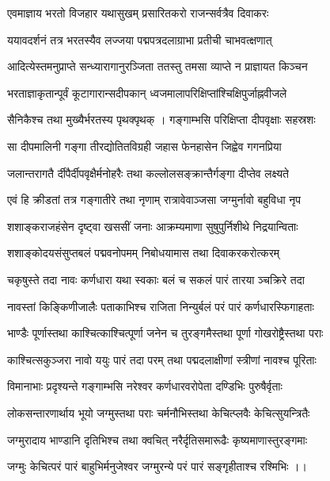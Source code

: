 \twolineshloka
{एवमाज्ञाय भरतो विजहार यथासुखम्}
{प्रसारितकरो राजन्सर्वत्रैव दिवाकरः}%

\twolineshloka
{ययावदर्शनं तत्र भरतस्यैव लज्जया}
{पद्मपत्रदलाग्राभा प्रतीची चाभवत्क्षणात्}%

\twolineshloka
{आदित्येस्तमनुप्राप्ते सन्ध्यारागानुरञ्जिता}
{ततस्तु तमसा व्याप्ते न प्राज्ञायत किञ्चन}%

\twolineshloka
{भरताज्ञाकृतान्पूर्वं कूटागारान्सदीपकान्}
{ध्वजमालापरिक्षिप्तांश्चिक्षिपुर्जाह्नवीजले}%

\twolineshloka
{सैनिकैश्च तथा मुख्यैर्भरतस्य पृथक्पृथक् ।}
{गङ्गाम्भसि परिक्षिप्ता दीपवृक्षाः सहस्रशः}%

\twolineshloka
{सा दीपमालिनी गङ्गा तीरद्योतितविग्रही}
{जहास फेनहासेन जिह्वेव गगनप्रिया}%

\twolineshloka
{जलान्तरागतै र्दीपैर्दीपवृक्षैर्मनोहरैः}
{तथा कल्लोलसङ्क्रान्तैर्गङ्गा दीप्तेव लक्ष्यते}%

\twolineshloka
{एवं हि क्रीडतां तत्र गङ्गातीरे तथा नृणाम्}
{रात्रावेवाञ्जसा जग्मुर्नावो बहुविधा नृप}%

\twolineshloka
{शशाङ्कराजहंसेन दृष्ट्वा खससीं जनाः}
{आक्रम्यमाणा सुषुपुर्निशीथे निद्रयान्विताः} %

\twolineshloka
{शशाङ्कोदयसंसुप्तबलं पद्मवनोपमम्}
{निबोधयामास तथा दिवाकरकरोत्करम्}%

\twolineshloka
{चकृषुस्ते तदा नावः कर्णधारा यथा स्वकाः}
{बलं च सकलं पारं तारया ञ्चक्रिरे तदा}%

\twolineshloka
{नावस्तां किङ्किणीजालैः पताकाभिश्च राजिता}
{निन्युर्बलं परं पारं कर्णधारस्फिगाहताः}%

\twolineshloka
{भाण्डैः पूर्णास्तथा काश्चित्काश्चित्पूर्णा जनेन च}
{तुरङ्गमैस्तथा पूर्णा गोखरोष्ट्रैस्तथा पराः}%

\twolineshloka
{काश्चित्सकुञ्जरा नावो ययुः पारं तदा परम्}
{तथा पद्मदलाक्षीणां स्त्रीणां नावश्च पूरिताः}%

\twolineshloka
{विमानाभाः प्रदृश्यन्ते गङ्गाम्भसि नरेश्वर}
{कर्णधारवरोपेता दण्डिभिः पुरुषैर्वृताः}%

\twolineshloka
{लोकसन्तारणार्थाय भूयो जग्मुस्तथा पराः}
{चर्मनौभिस्तथा केचित्प्लवैः केचित्सुयन्त्रितैः}%

\twolineshloka
{जग्मुरादाय भाण्डानि दृतिभिश्च तथा क्वचित्}
{नरैर्दृतिसमारूढैः कृष्यमाणास्तुरङ्गमाः}%

\twolineshloka
{जग्मुः केचित्परं पारं बाहुभिर्मनुजेश्वर}
{जग्मुरन्ये परं पारं सङ्गृहीताश्च रश्मिभिः ।।}%

